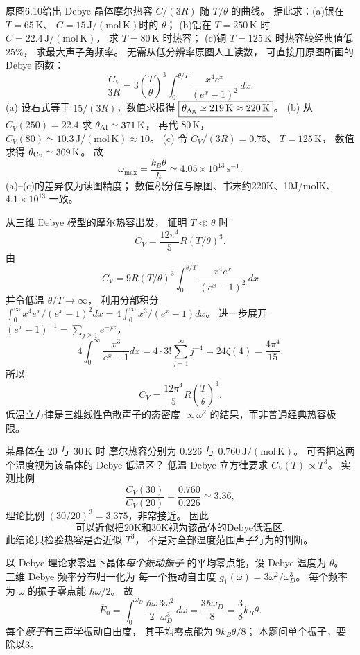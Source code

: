 原图6.10给出 Debye 晶体摩尔热容
$C/(3R)$ 随 $T/\theta$ 的曲线。
据此求：(a)银在 $T=65\,\mathrm K$、
$C=15\,\mathrm{J/(mol\,K)}$时的 $\theta$；
(b)铝在 $T=250\,\mathrm K$ 时
$C=22.4\,\mathrm{J/(mol\,K)}$，
求 $T=80\,\mathrm K$ 时热容；
(c)铜 $T=125\,\mathrm K$ 时热容较经典值低25\%，
求最大声子角频率。
\exsolution
无需从低分辨率原图人工读数，
可直接用原图所画的 Debye 函数：
\[
 \frac{C_V}{3R}=
 3\left(\frac{T}{\theta}\right)^3
 \int_0^{\theta/T}\frac{x^4e^x}{(e^x-1)^2}\,dx.
\]
(a) 设右式等于 $15/(3R)$，数值求根得
$\boxed{\theta_{\rm Ag}\simeq219\,\mathrm K\approx220\,\mathrm K}$。
(b) 从 $C_V(250)=22.4$ 求
$\theta_{\rm Al}\simeq371\,\mathrm K$，
再代 $80\,\mathrm K$，
$\boxed{C_V(80)\simeq10.3\,\mathrm{J/(mol\,K)}\approx10}$。
(c) 令 $C_V/(3R)=0.75$、
$T=125\,\mathrm K$，
数值求得 $\theta_{\rm Cu}\simeq309\,\mathrm K$。
故
\[
 \boxed{\omega_{\max}=\frac{k_B\theta}{\hbar}
 \simeq4.05\times10^{13}\,\mathrm{s^{-1}}}.
\]
\excheck (a)--(c)的差异仅为读图精度；
数值积分值与原图、书末约220K、10J/molK、$4.1\times10^{13}$
一致。

从三维 Debye 模型的摩尔热容出发，
证明 $T\ll\theta$ 时
\[
 C_V=\frac{12\pi^4}{5}R(T/\theta)^3.
\]
\exsolution
由
\[
 C_V=9R(T/\theta)^3
 \int_0^{\theta/T}\frac{x^4e^x}{(e^x-1)^2}\,dx
\]
并令低温 $\theta/T\to\infty$，
利用分部积分
$\int_0^\infty x^4e^x/(e^x-1)^2dx
=4\int_0^\infty x^3/(e^x-1)dx$。
进一步展开
$(e^x-1)^{-1}=\sum_{j\ge1}e^{-jx}$，
\[
 4\int_0^\infty\frac{x^3}{e^x-1}dx
 =4\cdot3!\sum_{j=1}^\infty j^{-4}
 =24\zeta(4)=\frac{4\pi^4}{15}.
\]
所以
\[
 \boxed{C_V=\frac{12\pi^4}{5}
 R\left(\frac{T}{\theta}\right)^3}.
\]
\excheck 低温立方律是三维线性色散声子的态密度
$\propto\omega^2$ 的结果，而非普通经典热容极限。

某晶体在 $20$ 与 $30\,\mathrm K$ 时
摩尔热容分别为 $0.226$ 与
$0.760\,\mathrm{J/(mol\,K)}$。
可否把这两个温度视为该晶体的 Debye 低温区？
\exsolution
低温 Debye 立方律要求
$C_V(T)\propto T^3$。
实测比例
\[
 \frac{C_V(30)}{C_V(20)}
 =\frac{0.760}{0.226}\simeq3.36,
\]
理论比例
$(30/20)^3=3.375$，非常接近。
因此
\[
 \boxed{\text{可以近似把20K和30K视为该晶体的Debye低温区}}.
\]
\excheck 此结论只检验热容是否近似 $T^3$，
不是对全部温度范围声子行为的判断。

以 Debye 理论求零温下晶体\emph{每个振动振子}
的平均零点能，设 Debye 温度为 $\theta$。
\exsolution
三维 Debye 频率分布归一化为
每一个振动自由度
$g_1(\omega)=3\omega^2/\omega_D^3$。
每个频率为 $\omega$ 的振子零点能 $\hbar\omega/2$。
故
\[
 \overline E_0=
 \int_0^{\omega_D}\frac{\hbar\omega}{2}
 \frac{3\omega^2}{\omega_D^3}\,d\omega
 =\frac{3\hbar\omega_D}{8}
 =\boxed{\frac38k_B\theta}.
\]
\excheck 每个\emph{原子}有三声学振动自由度，
其平均零点能为 $9k_B\theta/8$；
本题问单个振子，要除以3。

